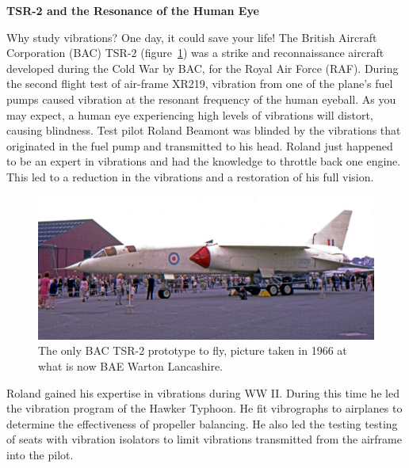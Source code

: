 \documentclass[12pt,letter]{article}
\begin{document}
	\begin{vibration_case_study}
		
			\textbf{TSR-2 and the Resonance of the Human Eye}

		\noindent Why study vibrations? One day, it could save your life! The British Aircraft Corporation (BAC) TSR-2 (figure~\ref{fig:TSR_2}) was a strike and reconnaissance aircraft developed during the Cold War by BAC, for the Royal Air Force (RAF).  During the second flight test of air-frame XR219, vibration from one of the plane's fuel pumps caused vibration at the resonant frequency of the human eyeball. As you may expect, a human eye experiencing high levels of vibrations will distort, causing blindness. Test pilot Roland Beamont was blinded by the vibrations that originated in the fuel pump and transmitted to his head. Roland just happened to be an expert in vibrations and had the knowledge to throttle back one engine. This led to a reduction in the vibrations and a restoration of his full vision. 
	
		\begin{figure}[H]
			\vspace{-2ex}
			\centering
			\includegraphics[width=5.0in]{../figures/TSR_2.jpg}
			\vspace{-1ex}
			\caption{The only BAC TSR-2 prototype to fly, picture taken in 1966 at what is now BAE Warton Lancashire.\protect\footnotemark[1]}
			\label{fig:TSR_2}
			\vspace{-2ex}
		\end{figure}
	
		


				
		Roland gained his expertise in vibrations during WW II. During this time he led the vibration program of the Hawker Typhoon. He fit vibrographs to airplanes to determine the effectiveness of propeller balancing. He also led the testing testing of seats with vibration isolators to limit vibrations transmitted from the airframe into the pilot. 


	\end{vibration_case_study}
\end{document}

